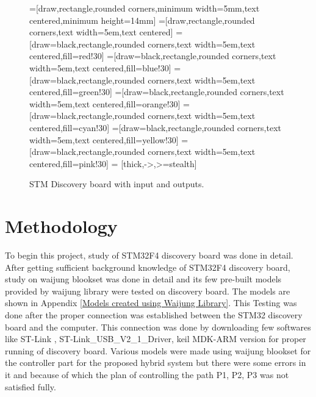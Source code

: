 \documentclass[a4paper,12pt]{iitmdiss}
\begin{document}
\begin{figure}[hbt!]
\centering
{}=[draw,rectangle,rounded corners,minimum width=5mm,text centered,minimum height=14mm]
=[draw,rectangle,rounded corners,text width=5em,text centered]
=[draw=black,rectangle,rounded corners,text width=5em,text centered,fill=red!30]
=[draw=black,rectangle,rounded corners,text width=5em,text centered,fill=blue!30]
=[draw=black,rectangle,rounded corners,text width=5em,text centered,fill=green!30]
=[draw=black,rectangle,rounded corners,text width=5em,text centered,fill=orange!30]
=[draw=black,rectangle,rounded corners,text width=5em,text centered,fill=cyan!30]
=[draw=black,rectangle,rounded corners,text width=5em,text centered,fill=yellow!30]
=[draw=black,rectangle,rounded corners,text width=5em,text centered,fill=pink!30]
 = [thick,->,>=stealth]
\caption{STM Discovery board with input and outputs.}
\label{fig:4.5}
\end{figure}

\section{Methodology}
To begin this project, study of STM32F4 discovery board was done in detail. After getting sufficient background knowledge of STM32F4 discovery board, study on waijung blookset was done in detail and its few pre-built models provided by waijung library were tested on discovery board. The models are shown in Appendix \ref{Models created using Waijung Library}. This Testing was done after the proper connection was established between the STM32 discovery board and the computer. This connection was done by downloading few softwares like ST-Link \textcolor{blue}{\cite{stmicroelectronics1}}, ST-Link\_USB\_V2\_1\_Driver, keil MDK-ARM version for proper running of discovery board. Various models were made using waijung blookset for the controller part for the proposed hybrid system but there were some errors in it and because of which the plan of controlling the path P1, P2, P3 was not satisfied fully.
\end{document}
